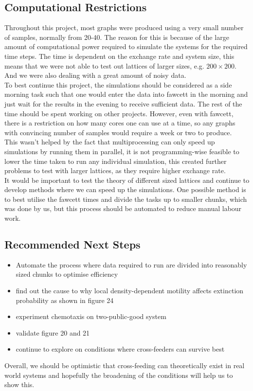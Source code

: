 \documentclass[11pt]{article}
\begin{document}
\subsection{Computational Restrictions}
Throughout this project, most graphs were produced using a very small number of samples, normally from 20-40. The reason for this is because of the large amount of computational power required to simulate the systems for the required time steps. The time is dependent on the exchange rate and system size, this means that we were not able to test out lattices of larger sizes, e.g. $200 \times 200$. And we were also dealing with a great amount of noisy data.\\
To best continue this project, the simulations should be considered as a side morning task such that one would enter the data into fawcett in the morning and just wait for the results in the evening to receive sufficient data. The rest of the time should be spent working on other projects. However, even with fawcett, there is a restriction on how many cores one can use at a time, so any graphs with convincing number of samples would require a week or two to produce.\\
This wasn't helped by the fact that multiprocessing can only speed up simulations by running them in parallel, it is not programming-wise feasible to lower the time taken to run any individual simulation, this created further problems to test with larger lattices, as they require higher exchange rate.\\
It would be important to test the theory of different sized lattices and continue to develop methods where we can speed up the simulations. One possible method is to best utilise the fawcett times and divide the tasks up to smaller chunks, which was done by us, but this process should be automated to reduce manual labour work.

\subsection{Recommended Next Steps}
\begin{itemize}
    \item Automate the process where data required to run are divided into reasonably sized chunks to optimise efficiency
    \item find out the cause to why local density-dependent motility affects extinction probability as shown in figure 24
    \item experiment chemotaxis on two-public-good system
    \item validate figure 20 and 21
    \item continue to explore on conditions where cross-feeders can survive best
\end{itemize}
\noindent Overall, we should be optimistic that cross-feeding can theoretically exist in real world systems and hopefully the broadening of the conditions will help us to show this.
\end{document}
